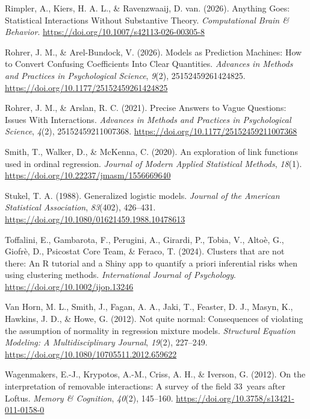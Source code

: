 \documentclass[
  man,
  longtable,
  nolmodern,
  notxfonts,
  notimes,
  colorlinks=true,linkcolor=blue,citecolor=blue,urlcolor=blue]{apa7}
\newlength{\cslhangindent}
\newenvironment{CSLReferences}[2] %
 {\begin{list}{}{%
  \setlength{\itemindent}{0pt}
  \setlength{\leftmargin}{0pt}
  \setlength{\parsep}{0pt}
  \ifodd #1
   \setlength{\leftmargin}{\cslhangindent}
   \setlength{\itemindent}{-1\cslhangindent}
  \fi
  \setlength{\itemsep}{#2\baselineskip}}}
 {\end{list}}
\begin{document}
\begin{CSLReferences}{1}{0}
Rimpler, A., Kiers, H. A. L., \& Ravenzwaaij, D. van. (2026). Anything
Goes: Statistical Interactions Without Substantive Theory.
\emph{Computational Brain \& Behavior}.
\url{https://doi.org/10.1007/s42113-026-00305-8}

Rohrer, J. M., \& Arel-Bundock, V. (2026). Models as Prediction
Machines: How to Convert Confusing Coefficients Into Clear Quantities.
\emph{Advances in Methods and Practices in Psychological Science},
\emph{9}(2), 25152459261424825.
\url{https://doi.org/10.1177/25152459261424825}

Rohrer, J. M., \& Arslan, R. C. (2021). Precise Answers to Vague
Questions: Issues With Interactions. \emph{Advances in Methods and
Practices in Psychological Science}, \emph{4}(2), 25152459211007368.
\url{https://doi.org/10.1177/25152459211007368}

Smith, T., Walker, D., \& McKenna, C. (2020). An exploration of link
functions used in ordinal regression. \emph{Journal of Modern Applied
Statistical Methods}, \emph{18}(1).
\url{https://doi.org/10.22237/jmasm/1556669640}

Stukel, T. A. (1988). Generalized logistic models. \emph{Journal of the
American Statistical Association}, \emph{83}(402), 426--431.
\url{https://doi.org/10.1080/01621459.1988.10478613}

Toffalini, E., Gambarota, F., Perugini, A., Girardi, P., Tobia, V.,
Altoè, G., Giofrè, D., Psicostat Core Team, \& Feraco, T. (2024).
Clusters that are not there: An {R} tutorial and a {S}hiny app to
quantify a priori inferential risks when using clustering methods.
\emph{International Journal of Psychology}.
\url{https://doi.org/10.1002/ijop.13246}

Van Horn, M. L., Smith, J., Fagan, A. A., Jaki, T., Feaster, D. J.,
Masyn, K., Hawkins, J. D., \& Howe, G. (2012). Not quite normal:
Consequences of violating the assumption of normality in regression
mixture models. \emph{Structural Equation Modeling: A Multidisciplinary
Journal}, \emph{19}(2), 227--249.
\url{https://doi.org/10.1080/10705511.2012.659622}

Wagenmakers, E.-J., Krypotos, A.-M., Criss, A. H., \& Iverson, G.
(2012). On the interpretation of removable interactions: A survey of the
field 33~years after Loftus. \emph{Memory \& Cognition}, \emph{40}(2),
145--160. \url{https://doi.org/10.3758/s13421-011-0158-0}


\end{CSLReferences}
\end{document}
